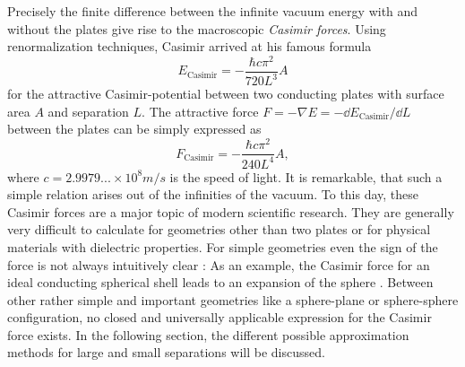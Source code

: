 Precisely the finite difference between the infinite vacuum energy with and without the plates give rise to the macroscopic \emph{Casimir forces}.
Using renormalization techniques, Casimir arrived at his famous formula \cite{Casimir_1948}
\begin{equation}\label{eq:3:casimir-energy-pp-conducting}
  E_\mathrm{Casimir} = -\frac{\hbar c \pi^2}{720 L^3} A
\end{equation}
for the attractive Casimir-potential between two conducting plates with surface area $A$ and separation $L$.
The attractive force $F=-\nabla E = -\dd E_\mathrm{Casimir} / \dd L$ between the plates can be simply expressed as
\begin{equation}\label{eq:3:casimir-force-pp-conducting}
  F_\mathrm{Casimir} = - \frac{\hbar c \pi^2}{240 L^4} A ,
\end{equation}
where $c=2.9979...\times 10^{8}\si{m/s}$ is the speed of light.
It is remarkable, that such a simple relation arises out of the infinities of the vacuum.
To this day, these Casimir forces are a major topic of modern scientific research. They are generally very difficult to calculate for geometries other than two plates or for physical materials with dielectric properties. 
For simple geometries even the sign of the force is not always intuitively clear \cite{Klimchitskaya_2009}: As an example, the Casimir force for an ideal conducting spherical shell leads to an expansion of the sphere \cite{Boyer_1968}.
Between other rather simple and important geometries like a sphere-plane or sphere-sphere configuration, no closed and universally applicable expression for the Casimir force exists.
In the following section, the different possible approximation methods for large and small separations will be discussed.

